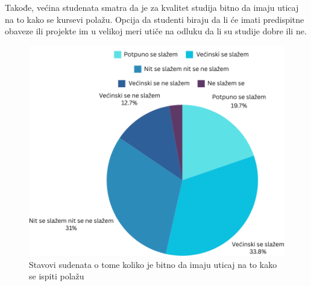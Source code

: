 \documentclass[a4paper]{article}
\begin{document}
Takođe, većina studenata smatra da je za kvalitet studija bitno da imaju uticaj na to kako se kursevi polažu. Opcija da studenti biraju da li će imati predispitne obaveze ili projekte im u velikoj meri utiče na odluku da li su studije dobre ili ne.\\
\begin{figure}[h!]
\begin{center}
    \includegraphics[scale = 0.3]{PieChartUticajNaPolaganje.png}
    \caption{Stavovi sudenata o tome koliko je bitno da imaju uticaj na to kako se ispiti polažu}
    \label{fig:uticaj}
\end{center}
\end{figure}\\
\end{document}

